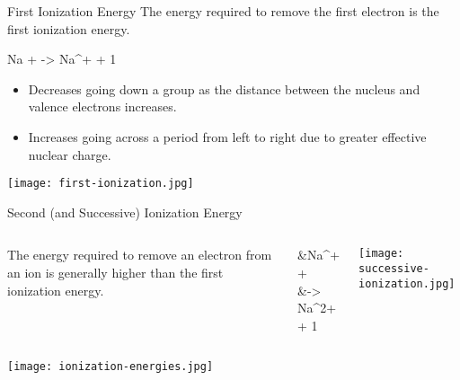\documentclass[notes=onlyslideswithnotes,notes=hide]{beamer}
\begin{document}
\begin{frame}[allowframebreaks]{First Ionization Energy}
	The energy required to remove the \alert{first} electron is the
	\alert{first ionization energy}.
	\begin{reaction*}
		Na\gas{} +  -> Na^{+}\gas{} + 1 \el
	\end{reaction*}
		
	\begin{itemize}
		\item Decreases going down a group as the distance between the
			nucleus and valence electrons increases.
		\item Increases going across a period from left to right due to
			greater effective nuclear charge.
	\end{itemize}

	\framebreak

	\begin{center}
		\texttt{[image: first-ionization.jpg]}
	\end{center}
\end{frame}

\begin{frame}[allowframebreaks]{Second (and Successive) Ionization Energy}
	\begin{columns}
		The energy required to remove an electron from an \alert{ion} is
		generally higher than the first ionization energy.
		
		\begin{reactions*}
			&Na^{+}\gas{} +  \\
			&\qquad -> Na^{2+}\gas{} + 1 \el
		\end{reactions*}
		\begin{center}
			\texttt{[image: successive-ionization.jpg]}
		\end{center}
	\end{columns}

	\framebreak%

	\begin{center}
		\texttt{[image: ionization-energies.jpg]}
	\end{center}
\end{frame}

\end{document}
